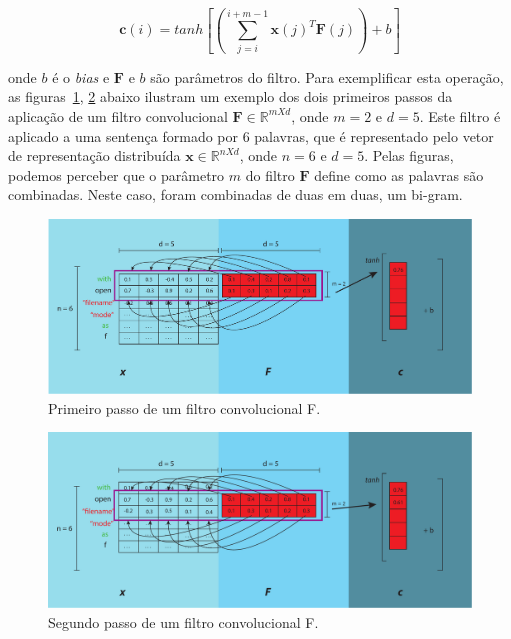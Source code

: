 \begin{equation}
    \bm{c}(i) = tanh \left[\left(\sum_{j=i}^{i + m - 1} \bm{x}(j)^{T}\bm{F}(j)\right) + b\right]
\end{equation}

onde $b$ é o \textit{bias} e $\bm{F}$ e $b$ são parâmetros do filtro. Para exemplificar esta operação, as figuras~\ref{fig:first-step-convolutional}, \ref{fig:second-step-convolutional} abaixo ilustram um exemplo dos dois primeiros passos da aplicação de um filtro convolucional $\bm{F} \in \mathbb{R}^{m X d}$, onde $m = 2$ e $d = 5$. Este filtro é aplicado a uma sentença formado por 6 palavras, que é representado pelo vetor de representação distribuída $\bm{x} \in \mathbb{R}^{n X d}$, onde $n = 6$ e $d = 5$. Pelas figuras, podemos perceber que o parâmetro $m$ do filtro $\bm{F}$ define como as palavras são combinadas. Neste caso, foram combinadas de duas em duas, um bi-gram.

\begin{figure}[h]
    \centering
    \includegraphics[width=1\textwidth]{figuras/cap-problema/first-step-convolution.pdf}
    \caption{Primeiro passo de um filtro convolucional F.}
    \label{fig:first-step-convolutional}
\end{figure}

\begin{figure}[h]
    \centering
    \includegraphics[width=1\textwidth]{figuras/cap-problema/second-step-convolution.pdf}
    \caption{Segundo passo de um filtro convolucional F.}
    \label{fig:second-step-convolutional}
\end{figure}


